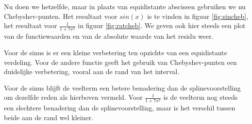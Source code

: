 Nu doen we hetzelfde, maar in plaats van equidistante abscissen gebruiken we nu Chebyshev-punten. Het  resultaat voor $sin(x)$ is te vinden in figuur \ref{fig:sincheb}, het resultaat voor $\frac{1}{1+7x^2}$ in figuur \ref{fig:ratcheb}. We geven ook hier steeds een plot van de functiewaarden en van de absolute waarde van het residu weer.

Voor de sinus is er een kleine verbetering ten opzichte van een equidistante verdeling. Voor de andere functie geeft het gebruik van Chebyshev-punten een duidelijke verbetering, vooral aan de rand van het interval. 

Voor de sinus blijft de veelterm een betere benadering dan de splinevoorstelling om dezelfde reden als hierboven vermeld. Voor $\frac{1}{1+7x^2}$ is de veelterm nog steeds een slechtere benadering dan de splinevoorstelling, maar is het verschil tussen beide aan de rand wel kleiner.


